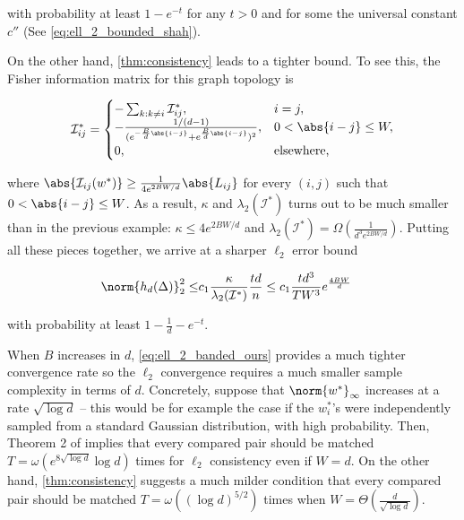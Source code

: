 with  probability at least $1 - e^{-t}$ for any $t > 0$ and for some the universal constant $c''$ (See \ref{eq:ell_2_bounded_shah}).

On the other hand, \ref{thm:consistency} leads to a tighter bound. To see this, the Fisher information matrix for this graph topology is

\begin{equation}
    \mathcal{I}^*_{ij} = \begin{cases}
    -\sum_{k: k \neq i} \mathcal{I}^*_{ij}, & i = j, \\
    -\frac{1/(d-1)}{(e^{-\frac{B}{d}\abs{i-j}}+e^{\frac{B}{d}\abs{i-j}})^2}, & 0 < \abs{i - j} \leq W, \\
    0, & \text{elsewhere,}
    \end{cases}
\end{equation}

where $\abs{\mathcal{I}_{ij}(w^*)} \geq \frac{1}{4e^{2BW/d}} \abs{L_{ij}}$ for every $(i, j)$ such that $0 < \abs{i - j} \leq W$. As a result, $\kappa$ and $\lambda_2(\mathcal{I}^*)$ turns out to be much smaller than in the previous example: $\kappa \leq 4e^{2BW/d}$ and $\lambda_2(\mathcal{I}^*) = \Omega\left(\frac{1}{d^3e^{2BW/d}}\right)$.
Putting all these pieces together, we arrive at a sharper $\ell_2$ error bound

\begin{equation} \label{eq:ell_2_banded_ours}
\begin{split}
    \norm{h_d(\Delta)}_2^2 
    \leq & c_1 \frac{\kappa}{\lambda_2(\mathcal{I}^*)} \frac{td}{n}

    \leq c_1 \frac{td^3}{TW^3} e^{\frac{4BW}{d}}
\end{split}
\end{equation}

with probability at least $1 - \frac{1}{d} - e^{-t}$. 

When $B$ increases in $d$, \ref{eq:ell_2_banded_ours} provides a much tighter convergence rate so the $\ell_2$ convergence requires a much smaller sample complexity in terms of $d$. Concretely, suppose that $\norm{w^*}_\infty$ increases at a rate $\sqrt{\log d}$ -- this would be for example the case if the $w_i^*$'s were independently  sampled from a standard Gaussian distribution, with high probability. Then, Theorem 2 of \cite{shah2016estimation} implies that every compared pair should be matched $T = \omega(e^{8\sqrt{\log d}} \log d)$ times for $\ell_2$ consistency even if $W = d$. On the other hand, \ref{thm:consistency} suggests a much milder condition that every compared pair should be matched $T = \omega((\log d)^{5/2})$ times when $W = \Theta(\frac{d}{\sqrt{\log d}})$. 

